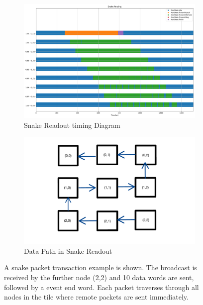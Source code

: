\begin{figure}
\centering
\begin{subfigure}{.5\textwidth}
  \centering
  \includegraphics[width=\textwidth]{images/snake_timer.pdf}
  \caption{Snake Readout timing Diagram}
\end{subfigure}%
\begin{subfigure}{.5\textwidth}
  \centering
  \includegraphics[width=\textwidth]{images/snake_ex_read.pdf}
  \caption{Data Path in Snake Readout}
\end{subfigure}
\caption{A snake packet transaction example is shown. The broadcast is received by the further node (2,2) and 10 data words are sent, followed by a event end word.
Each packet traverses through all nodes in the tile where remote packets are sent immediately.}
\label{fig:snake_timer}
\end{figure}

